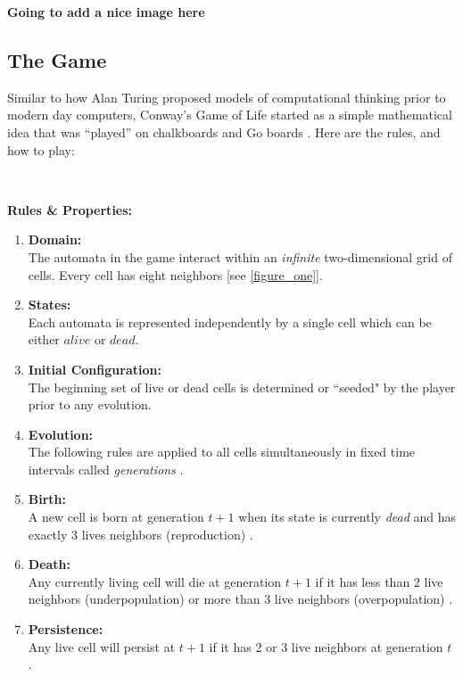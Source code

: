 \documentclass{article}
\theoremstyle{definition}
\theoremstyle{plain}
\theoremstyle{plain}
\begin{document}
\textbf{Going to add a nice image here}

\subsection{The Game}
Similar to how Alan Turing proposed models of computational thinking prior to modern day computers, Conway's Game of Life started as a simple mathematical idea that was “played” on chalkboards and Go boards \cite{Izhikevich_Conway_Seth}. Here are the rules, and how to play: 

\

\textbf{Rules \& Properties: }
\begin{enumerate}
  \label{rules}
  \item \textbf{Domain: }\\ The automata in the game interact within an \textit{infinite} two-dimensional grid of cells. Every cell has eight neighbors \cite{Izhikevich_Conway_Seth}[see \ref{figure_one}]. \label{rule_one}

  \item \textbf{States: }\\ Each automata is represented independently by a single cell which can be either $\textit{alive}$ or $\textit{dead}$.

  \item \textbf{Initial Configuration: } \\ The beginning set of live or dead cells is determined or ``seeded" by the player prior to any evolution.

  \item \textbf{Evolution: } \\ The following rules are applied to all cells simultaneously in fixed time intervals called \textit{generations} \cite{Bontes2019}.

  \item \textbf{Birth: } \\ A new cell is born at generation $t + 1$ when its state is currently \textit{dead} and has exactly 3 lives neighbors (reproduction) \cite{Bontes2019}.

  \item \textbf{Death: } \\ Any currently living cell will die at generation $t + 1$ if it has less than 2 live neighbors (underpopulation) or more than 3 live neighbors (overpopulation) \cite{Bontes2019}.

  \item \textbf{Persistence: } \\ Any live cell will persist at $t + 1$ if it has 2 or 3 live neighbors at generation $t$ \cite{Izhikevich_Conway_Seth}.
\end{enumerate}
\end{document}
